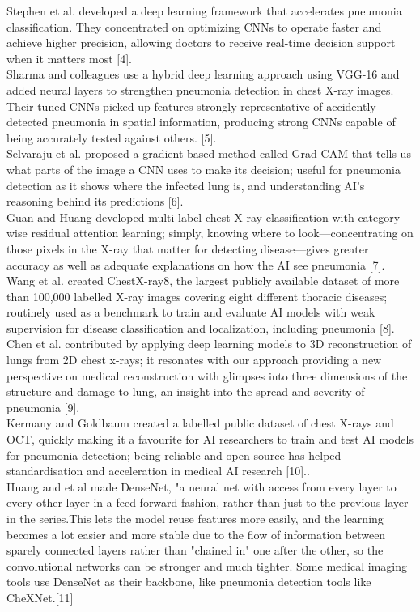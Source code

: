 \documentclass[conference]{IEEEtran}
\begin{document}
Stephen et al. developed a deep learning framework that accelerates pneumonia classification. They concentrated on optimizing CNNs to operate faster and achieve higher precision, allowing doctors to receive real-time decision support when it matters most [4].\\
Sharma and colleagues use a hybrid deep learning approach using VGG-16 and added neural layers to strengthen pneumonia detection in chest X-ray images. Their tuned CNNs picked up features strongly representative of accidently detected pneumonia in spatial information, producing strong CNNs capable of being accurately tested against others. [5].\\
Selvaraju et al. proposed a gradient-based method called Grad-CAM that tells us what parts of the image a CNN uses to make its decision; useful for pneumonia detection as it shows where the infected lung is, and understanding AI's reasoning behind its predictions [6].\\
Guan and Huang developed multi-label chest X-ray classification with category-wise residual attention learning; simply, knowing where to look—concentrating on those pixels in the X-ray that matter for detecting disease—gives greater accuracy as well as adequate explanations on how the AI see pneumonia [7].\\
Wang et al. created ChestX-ray8, the largest publicly available dataset of more than 100,000 labelled X-ray images covering eight different thoracic diseases; routinely used as a benchmark to train and evaluate AI models with weak supervision for disease classification and localization, including pneumonia [8].\\
Chen et al. contributed by applying deep learning models to 3D reconstruction of lungs from 2D chest x-rays; it resonates with our approach providing a new perspective on medical reconstruction with glimpses into three dimensions of the structure and damage to lung, an insight into the spread and severity of pneumonia [9].\\
Kermany and Goldbaum created a labelled public dataset of chest X-rays and OCT, quickly making it a favourite for AI researchers to train and test AI models for pneumonia detection; being reliable and open-source has helped standardisation and acceleration in medical AI research [10]..\\
Huang and et al made DenseNet, "a neural net with access from every layer to every other layer in a feed-forward fashion, rather than just to the previous layer in the series.This lets the model reuse features more easily, and the learning becomes a lot easier and more stable due to the flow of information between sparely connected layers rather than "chained in" one after the other, so the convolutional networks can be stronger and much tighter. Some medical imaging tools use DenseNet as their backbone, like pneumonia detection tools like CheXNet.[11]\\
\end{document}
